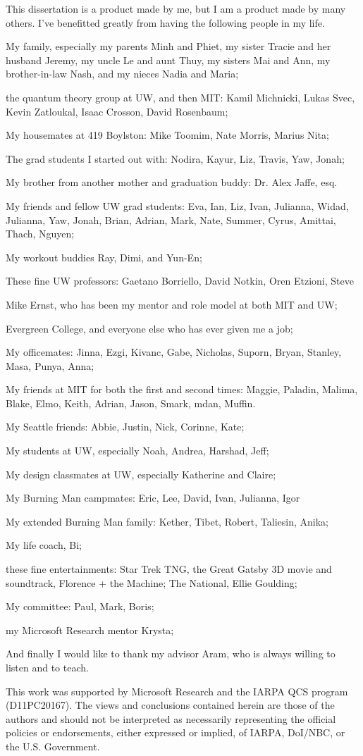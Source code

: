 This dissertation is a product made by me, but I am a product made by many others.
I've benefitted greatly from having the following people in my life.

My family, especially my parents Minh and Phiet, my sister Tracie and her husband Jeremy,
my uncle Le and aunt Thuy, my sisters Mai and Ann, my brother-in-law Nash,
and my nieces Nadia and Maria;

the quantum theory group at UW, and then MIT: Kamil Michnicki, Lukas Svec, Kevin Zatloukal, Isaac Crosson, David Rosenbaum;

My housemates at 419 Boylston: Mike Toomim, Nate Morris, Marius Nita;

The grad students I started out with: Nodira, Kayur, Liz, Travis, Yaw, Jonah;

My brother from another mother and graduation buddy: Dr. Alex Jaffe, esq.

My friends and fellow UW grad students: Eva, Ian, Liz, Ivan, Julianna, Widad, Julianna, Yaw, Jonah, Brian, Adrian, Mark, Nate, Summer, Cyrus, Amittai, Thach, Nguyen;

My workout buddies Ray, Dimi, and Yun-En;

These fine UW professors: Gaetano Borriello, David Notkin, Oren Etzioni, Steve

Mike Ernst, who has been my mentor and role model at both MIT and UW;

Evergreen College, and everyone else who has ever given me a job;

My officemates: Jinna, Ezgi, Kivanc, Gabe, Nicholas, Suporn, Bryan, Stanley, Masa, Punya, Anna;

My friends at MIT for both the first and second times:
Maggie, Paladin, Malima, Blake, Elmo, Keith, Adrian, Jason, Smark, mdan, Muffin.

My Seattle friends: Abbie, Justin, Nick, Corinne, Kate;

My students at UW, especially Noah, Andrea, Harshad, Jeff;

My design classmates at UW, especially Katherine and Claire;

My Burning Man campmates: Eric, Lee, David, Ivan, Julianna, Igor

My extended Burning Man family: Kether, Tibet, Robert, Taliesin, Anika;

My life coach, Bi;

these fine entertainments: Star Trek TNG, the Great Gatsby 3D movie and soundtrack, Florence + the Machine;
The National, Ellie Goulding;

My committee: Paul, Mark, Boris;

my Microsoft Research mentor Krysta;

And finally I would like to thank my advisor Aram,
who is always willing to listen and to teach.

This work was supported by Microsoft Research and
the IARPA QCS program (D11PC20167).  The
views and conclusions contained herein are those of the authors and
should not be interpreted as necessarily representing the official
policies or endorsements, either expressed or implied, of IARPA,
DoI/NBC, or the U.S. Government.